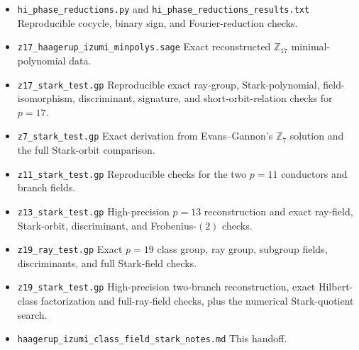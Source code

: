 \documentclass[11pt,reqno]{amsart}
\theoremstyle{plain}
\begin{document}
\begin{itemize}
verification was not completed in the bounded run.
\item \texttt{hi\_\allowbreak phase\_\allowbreak reductions.py} and \texttt{hi\_\allowbreak phase\_\allowbreak reductions\_\allowbreak results.txt}
Reproducible cocycle, binary sign, and Fourier-reduction checks.
\item \texttt{z17\_\allowbreak haagerup\_\allowbreak izumi\_\allowbreak minpolys.sage}
Exact reconstructed \(\mathbb Z_{17}\) minimal-polynomial data.
\item \texttt{z17\_\allowbreak stark\_\allowbreak test.gp}
Reproducible exact ray-group, Stark-polynomial, field-isomorphism, discriminant, signature, and short-orbit-relation checks for \(p=17\).
\item \texttt{z7\_\allowbreak stark\_\allowbreak test.gp}
Exact derivation from Evans--Gannon's \(\mathbb Z_7\) solution and the full Stark-orbit comparison.
\item \texttt{z11\_\allowbreak stark\_\allowbreak test.gp}
Reproducible checks for the two \(p=11\) conductors and branch fields.
\item \texttt{z13\_\allowbreak stark\_\allowbreak test.gp}
High-precision \(p=13\) reconstruction and exact ray-field, Stark-orbit, discriminant, and Frobenius-\((2)\) checks.
\item \texttt{z19\_\allowbreak ray\_\allowbreak test.gp}
Exact \(p=19\) class group, ray group, subgroup fields, discriminants, and full Stark-field checks.
\item \texttt{z19\_\allowbreak stark\_\allowbreak test.gp}
High-precision two-branch reconstruction, exact Hilbert-class factorization and full-ray-field checks, plus the numerical Stark-quotient search.
\item \texttt{haagerup\_\allowbreak izumi\_\allowbreak class\_\allowbreak field\_\allowbreak stark\_\allowbreak notes.md}
This handoff.
\end{itemize}
\end{document}
